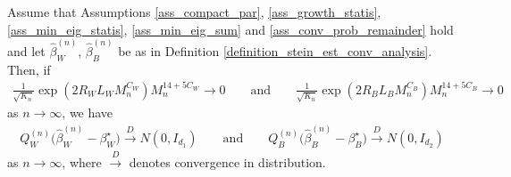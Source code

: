 \documentclass[10pt,a4paper]{amsart}
\begin{document}
\begin{Theorem} \label{theorem_asym_norm_conv}
    Assume that Assumptions \ref{ass_compact_par}, \ref{ass_growth_statis}, \ref{ass_min_eig_statis}, \ref{ass_min_eig_sum} and \ref{ass_conv_prob_remainder} hold and let $\hat{\beta}_W^{(n)}$, $\hat{\beta}_B^{(n)}$ be as in Definition \ref{definition_stein_est_conv_analysis}. Then, if 
    \begin{align*}
     \frac{1}{\sqrt{K_n}}  \exp(2R_WL_WM_n^{C_W}) M_n^{14+5C_W}  \rightarrow 0 \qquad \text{and} \qquad \frac{1}{\sqrt{K_n}} \exp(2R_BL_B M_n^{C_B}) M_n^{14+5C_B} \rightarrow 0
    \end{align*}
    as $ n \rightarrow \infty $, we have
    \begin{align*}
        Q_W^{(n)} \big( \hat{\beta}_W^{(n)}-\beta_W^{\star}\big) \xrightarrow{D} N(0,I_{d_1}) \qquad \text{and} \qquad Q_B^{(n)} \big( \hat{\beta}_B^{(n)}-\beta_B^{\star}\big) \xrightarrow{D} N(0,I_{d_2})
    \end{align*}
    as $n \rightarrow \infty$, where $\xrightarrow{D}$ denotes convergence in distribution.
\end{Theorem}
\end{document}
